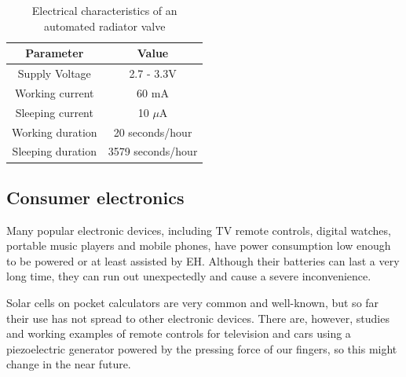 \documentclass[a4paper,10pt]{article}
\begin{document}
\begin{table}[h]
  \centering
  \begin{tabular}{|c|c|}
\hline
    Parameter & Value \\
\hline
Supply Voltage & 2.7 - 3.3V \\
Working current & 60 mA \\
Sleeping current & 10 $\mu$A \\
Working duration & 20 seconds/hour \\
Sleeping duration & 3579 seconds/hour \\
\hline
  \end{tabular}
\caption{Electrical characteristics of an automated radiator valve}
\label{tab:zbarv}
\end{table}

\subsection{Consumer electronics}

Many popular electronic devices, including TV remote controls, digital watches, portable music players and mobile phones, have power consumption low enough to be powered or at least assisted by \ac{EH}. Although their batteries can last a very long time, they can run out unexpectedly and cause a severe inconvenience. 

Solar cells on pocket calculators are very common and well-known, but so far their use has not spread to other electronic devices. There are, however, studies and working examples of remote controls for television and cars using a piezoelectric generator powered by the pressing force of our fingers, so this might change in the near future. 
\end{document}
